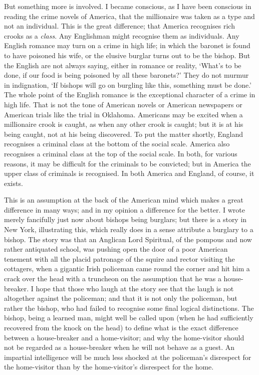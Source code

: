 \documentclass{book}
\begin{document}
But something more is involved. I became conscious, as I have been conscious in reading the crime novels of America, that the millionaire was taken as a type and not an individual. This is the great difference; that America recognises rich crooks as a \emph{class}. Any Englishman might recognise them as individuals. Any English romance may turn on a crime in high life; in which the baronet is found to have poisoned his wife, or the elusive burglar turns out to be the bishop. But the English are not always saying, either in romance or reality, ‘What’s to be done, if our food is being poisoned by all these baronets?’ They do not murmur in indignation, ‘If bishops will go on burgling like this, something must be done.’ The whole point of the English romance is the exceptional character of a crime in high life. That is not the tone of American novels or American newspapers or American trials like the trial in Oklahoma. Americans may be excited when a millionaire crook is caught, as when any other crook is caught; but it is at his being caught, not at his being discovered. To put the matter shortly, England recognises a criminal class at the bottom of the social scale. America also recognises a criminal class at the top of the social scale. In both, for various reasons, it may be difficult for the criminals to be convicted; but in America the upper class of criminals is recognised. In both America and England, of course, it exists.

This is an assumption at the back of the American mind which makes a great difference in many ways; and in my opinion a difference for the better. I wrote merely fancifully just now about bishops being burglars; but there is a story in New York, illustrating this, which really does in a sense attribute a burglary to a bishop. The story was that an Anglican Lord Spiritual, of the pompous and now rather antiquated school, was pushing open the door of a poor American tenement with all the placid patronage of the squire and rector visiting the cottagers, when a gigantic Irish policeman came round the corner and hit him a crack over the head with a truncheon on the assumption that he was a house-breaker. I hope that those who laugh at the story see that the laugh is not altogether against the policeman; and that it is not only the policeman, but rather the bishop, who had failed to recognise some final logical distinctions. The bishop, being a learned man, might well be called upon (when he had sufficiently recovered from the knock on the head) to define what is the exact difference between a house-breaker and a home-visitor; and why the home-visitor should not be regarded as a house-breaker when he will not behave as a guest. An impartial intelligence will be much less shocked at the policeman’s disrespect for the home-visitor than by the home-visitor’s disrespect for the home.
\end{document}
